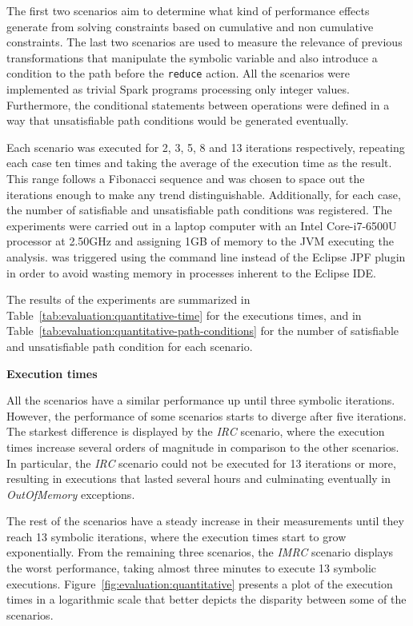 The first two scenarios aim to determine what kind of performance effects generate from solving constraints based on cumulative and non cumulative constraints. The last two scenarios are used to measure the relevance of previous transformations that manipulate the symbolic variable and also introduce a condition to the path before the \texttt{reduce} action. All the scenarios were implemented as trivial Spark programs processing only integer values. Furthermore, the conditional statements between operations were defined in a way that unsatisfiable path conditions would be generated eventually.

Each scenario was executed for 2, 3, 5, 8 and 13 iterations respectively, repeating each case ten times and taking the average of the execution time as the result. This range follows a Fibonacci sequence and was chosen to space out the iterations enough to make any trend distinguishable. Additionally, for each case, the number of satisfiable and unsatisfiable path conditions was registered. The experiments were carried out in a laptop computer with an Intel Core-i7-6500U processor at 2.50GHz and assigning 1GB of memory to the JVM executing the analysis. \jpf{} was triggered using the command line instead of the Eclipse JPF plugin in order to avoid wasting memory in processes inherent to the Eclipse IDE.


The results of the experiments are summarized in Table~\ref{tab:evaluation:quantitative-time} for the executions times, and in Table~\ref{tab:evaluation:quantitative-path-conditions} for the number of satisfiable and unsatisfiable path condition for each scenario.

\textbf{Execution times}

All the scenarios have a similar performance up until three symbolic iterations. However, the performance of some scenarios starts to diverge after five iterations. The starkest difference is displayed by the \textit{IRC} scenario, where the execution times increase several orders of magnitude in comparison to the other scenarios. In particular, the \textit{IRC} scenario could not be executed for 13 iterations or more, resulting in executions that lasted several hours and culminating eventually in \textit{OutOfMemory} exceptions.

The rest of the scenarios have a steady increase in their measurements until they reach 13 symbolic iterations, where the execution times start to grow exponentially. From the remaining three scenarios, the \textit{IMRC} scenario displays the worst performance, taking almost three minutes to execute 13 symbolic executions. Figure~\ref{fig:evaluation:quantitative} presents a plot of the execution times in a logarithmic scale that better depicts the disparity between some of the scenarios.

